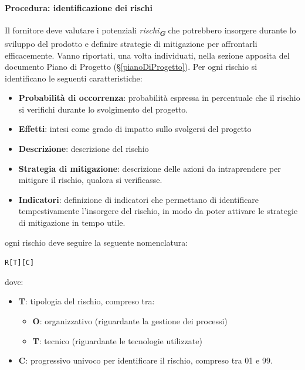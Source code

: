 \documentclass[a4paper,12pt]{article}
\newcommand{\glossario}[1]{\textit{#1}\textsubscript{\textbf{\textit{\textcolor{lightblack}{G}}}}}
\begin{document}
\paragraph{Procedura: identificazione dei rischi}
Il fornitore deve valutare i potenziali \glossario{rischi} che potrebbero
insorgere durante lo sviluppo del prodotto e definire strategie di mitigazione
per affrontarli efficacemente. Vanno riportati, una volta individuati, nella
sezione apposita del documento Piano di Progetto (§\ref{pianoDiProgetto}). Per
ogni rischio si identificano le seguenti caratteristiche:
\begin{itemize}
    \item \textbf{Probabilità di occorrenza}: probabilità espressa in percentuale che il rischio si verifichi durante lo svolgimento del progetto.
    \item \textbf{Effetti}: intesi come grado di impatto sullo svolgersi del progetto
    \item \textbf{Descrizione}: descrizione del rischio
    \item \textbf{Strategia di mitigazione}: descrizione delle azioni da intraprendere per mitigare il rischio, qualora si verificasse.
    \item \textbf{Indicatori}: definizione di indicatori che permettano di identificare tempestivamente l'insorgere del rischio, in modo da poter attivare le strategie di mitigazione in tempo utile.
\end{itemize}
ogni rischio deve seguire la seguente nomenclatura:
\begin{center}
    \texttt{R[T][C]}
\end{center}
dove:
\begin{itemize}
    \item \textbf{T}: tipologia del rischio, compreso tra:
          \begin{itemize}
              \item \textbf{O}: organizzativo (riguardante la gestione dei processi)
              \item \textbf{T}: tecnico (riguardante le tecnologie utilizzate)
          \end{itemize}
    \item \textbf{C}: progressivo univoco per identificare il rischio, compreso tra 01 e 99.
\end{itemize}
\end{document}
